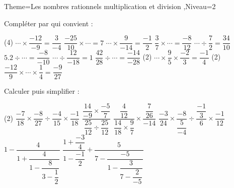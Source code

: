 \documentclass[a4paper,12pt]{article}
\begin{document}
\begin{Maquette}[Fiche]{Theme=Les nombres rationnels multiplication et division ,Niveau=2}
\begin{exercice}
Compléter par qui convient :
\begin{tasks}(4)
\task $\cdots\times \dfrac{-12}{-9}=\dfrac{3}{-4}$
\task $\dfrac{-25}{10}\times\cdots =7$
\task $ \cdots\times \dfrac{9}{-14}=\dfrac{-1}{2} $
\task $\dfrac{3}{7}\times\cdots =\dfrac{-8}{12}$
\task $\cdots\div\dfrac{7}{2}=\dfrac{34}{10}$
\task $5.2\div\cdots=\dfrac{-8}{-10}$
\task $ \cdots\div\dfrac{12}{-18}=1$
\task $ \dfrac{42}{28}\div\cdots =\dfrac{-14}{-28} $
\task*(2) $ \cdots\times\dfrac{9}{5}\times\dfrac{-2}{3}=\dfrac{-1}{4} $
\task*(2) $ \dfrac{-12}{9}\times\cdots\times\dfrac{1}{4}=\dfrac{-9}{27}$ 
\end{tasks}
\end{exercice}
\begin{exercice}
Calculer puis simplifier :
\begin{tasks}(2)
\task $\dfrac{-7}{18}\times\dfrac{-8}{27}\div\dfrac{-4}{15}\times\dfrac{-1}{18}$
\task $\dfrac{\dfrac{14}{-9}\times\dfrac{-5}{7}}{\dfrac{25}{12}\div\dfrac{25}{12}} $
\task $\dfrac{\dfrac{4}{12}}{\dfrac{14}{18}\times\dfrac{9}{7}}\times\dfrac{\dfrac{7}{26}}{-14} $
\task $\dfrac{-3}{24}\times\dfrac{-8}{\dfrac{5}{-4}}\div\dfrac{\dfrac{-1}{3}}{6}\times\dfrac{-1}{12}$
\task $1-\dfrac{4}{1+\dfrac{4}{1-\dfrac{8}{3-\dfrac{1}{2}}}}$
\task $\dfrac{1+\dfrac{-3}{4}}{1-\dfrac{-1}{2}}+\dfrac{5}{7-\dfrac{-5}{1-\dfrac{3}{7-\dfrac{2}{-5}}}}$
\end{tasks}
\end{exercice}











\end{Maquette}
\end{document}

